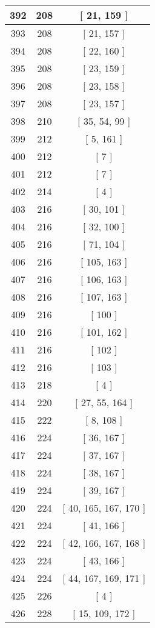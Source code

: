 \begin{center}
\begin{longtable}[H]{|| c c c ||}
392 & 208 & [ 21, 159 ] \\ 
\hline
393 & 208 & [ 21, 157 ] \\ 
\hline
394 & 208 & [ 22, 160 ] \\ 
\hline
395 & 208 & [ 23, 159 ] \\ 
\hline
396 & 208 & [ 23, 158 ] \\ 
\hline
397 & 208 & [ 23, 157 ] \\ 
\hline
398 & 210 & [ 35, 54, 99 ] \\ 
\hline
399 & 212 & [ 5, 161 ] \\ 
\hline
400 & 212 & [ 7 ] \\ 
\hline
401 & 212 & [ 7 ] \\ 
\hline
402 & 214 & [ 4 ] \\ 
\hline
403 & 216 & [ 30, 101 ] \\ 
\hline
404 & 216 & [ 32, 100 ] \\ 
\hline
405 & 216 & [ 71, 104 ] \\ 
\hline
406 & 216 & [ 105, 163 ] \\ 
\hline
407 & 216 & [ 106, 163 ] \\ 
\hline
408 & 216 & [ 107, 163 ] \\ 
\hline
409 & 216 & [ 100 ] \\ 
\hline
410 & 216 & [ 101, 162 ] \\ 
\hline
411 & 216 & [ 102 ] \\ 
\hline
412 & 216 & [ 103 ] \\ 
\hline
413 & 218 & [ 4 ] \\ 
\hline
414 & 220 & [ 27, 55, 164 ] \\ 
\hline
415 & 222 & [ 8, 108 ] \\ 
\hline
416 & 224 & [ 36, 167 ] \\ 
\hline
417 & 224 & [ 37, 167 ] \\ 
\hline
418 & 224 & [ 38, 167 ] \\ 
\hline
419 & 224 & [ 39, 167 ] \\ 
\hline
420 & 224 & [ 40, 165, 167, 170 ] \\ 
\hline
421 & 224 & [ 41, 166 ] \\ 
\hline
422 & 224 & [ 42, 166, 167, 168 ] \\ 
\hline
423 & 224 & [ 43, 166 ] \\ 
\hline
424 & 224 & [ 44, 167, 169, 171 ] \\ 
\hline
425 & 226 & [ 4 ] \\ 
\hline
426 & 228 & [ 15, 109, 172 ] \\ 

\end{longtable}
\end{center}
